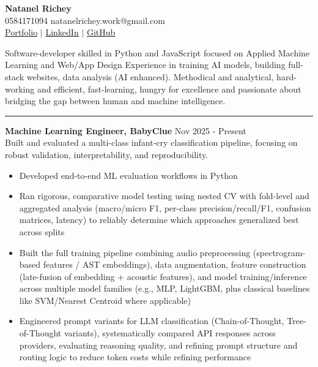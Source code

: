 \documentclass[10pt]{article}
\newcommand{\cvsection}[1]{
    \vspace{0.04in}
    \noindent{\large \textbf{#1}}
    \vspace{0.01in}
    \hrule
    \vspace{0.03in}
}
\begin{document}
\begin{center}
    {\huge \textbf{Natanel Richey}}\\
    \vspace{0.05in}
    0584171094 natanelrichey.work@gmail.com\\
    \vspace{0.02in}
    \href{https://natanel-richey.space}{Portfolio} $|$ \href{https://www.linkedin.com/in/natanelrichey}{LinkedIn} $|$ \href{https://github.com/NatanelRichey}{GitHub}
    \vspace{0.03in}
\end{center}

\vspace{0.05in}
\vspace{0.04in}

\noindent Software-developer skilled in Python and JavaScript focused on Applied Machine Learning and Web/App Design Experience in training AI models, building full-stack websites, data analysis (AI enhanced). Methodical and analytical, hard-working and efficient, fast-learning, hungry for excellence and passionate about bridging the gap between human and machine intelligence.

\cvsection{Professional Experience}
\noindent\textbf{Machine Learning Engineer, BabyClue} \hfill Nov 2025 - Present\\
Built and evaluated a multi-class infant-cry classification pipeline, focusing on robust validation, interpretability, and reproducibility.

\begin{itemize}
    \item Developed end-to-end ML evaluation workflows in Python
    \item Ran rigorous, comparative model testing using nested CV with fold-level and aggregated analysis (macro/micro F1, per-class precision/recall/F1, confusion matrices, latency) to reliably determine which approaches generalized best across splits
    \item Built the full training pipeline combining audio preprocessing (spectrogram-based features / AST embeddings), data augmentation, feature construction (late-fusion of embedding + acoustic features), and model training/inference across multiple model families (e.g., MLP, LightGBM, plus classical baselines like SVM/Nearest Centroid where applicable)
    \item Engineered prompt variants for LLM classification (Chain-of-Thought, Tree-of-Thought variants), systematically compared API responses across providers, evaluating reasoning quality, and refining prompt structure and routing logic to reduce token costs while refining performance
\end{itemize}
\end{document}
